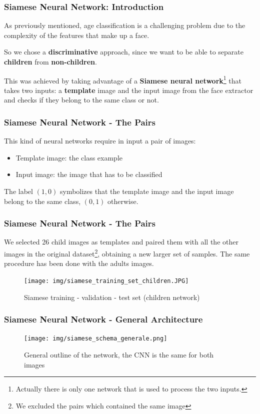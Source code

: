 \documentclass{beamer}
\begin{document}
	\begin{frame}
		\frametitle{Siamese Neural Network: Introduction}
		As previously mentioned, age classification is a challenging problem due to the complexity of the features that make up a face.
		
		\bigskip
		
		
		So we chose a \textbf{discriminative} approach, since we want to be able to separate \textbf{children} from \textbf{non-children}.
		
		\bigskip
		
		
		This was achieved by taking advantage of a \textbf{Siamese neural network}\footnote{Actually there is only one network that is used to process the two inputs.} that takes two inputs: a \textbf{template} image and the input image from the face extractor and checks if they belong to the same class or not. 	
	\end{frame}
	
	\begin{frame}
		\frametitle{Siamese Neural Network - The Pairs}
		This kind of neural networks require in input a pair of images:
		\begin{itemize}
			\item Template image: the class example
			\item Input image: the image that has to be classified
		\end{itemize}		
		The label $(1,0)$ symbolizes that the template image and the input image belong to the same class, $(0,1)$ otherwise.
	\end{frame}
	
	\begin{frame}
		\frametitle{Siamese Neural Network - The Pairs}
		We selected 26 child images as templates and paired them with all the other images in the original dataset\footnote{We excluded the pairs which contained the same image}, obtaining a new larger set of samples. The same procedure has been done with the adults images.
		\begin{figure}
			\centering
			\texttt{[image: img/siamese\_training\_set\_children.JPG]}
    		\caption{Siamese training - validation - test set (children network)}
    		\label{fig:siamese_general}
		\end{figure}
	\end{frame}
	
	\begin{frame}
		\frametitle{Siamese Neural Network - General Architecture}		
		\begin{figure}
			\centering
			\texttt{[image: img/siamese\_schema\_generale.png]}
    		\caption{General outline of the network, the CNN is the same for both images}
    		\label{fig:siamese_dataset}
		\end{figure}
	\end{frame}
	
\end{document}
